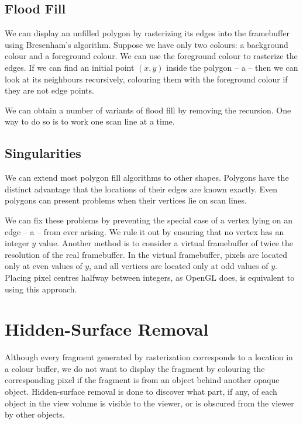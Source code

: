 \documentclass[../COS3712_Notes.tex]{subfiles}
\begin{document}
      \subsection{Flood Fill}
        We can display an unfilled polygon by rasterizing its edges into the framebuffer
        using Bresenham's algorithm.
        Suppose we have only two colours: a background colour and a foreground colour.
        We can use the foreground colour to rasterize the edges.
        If we can find an initial point $(x, y)$ inside the polygon -- a  --
        then we can look at its neighbours recursively, colouring them with the
        foreground colour if they are not edge points.

        We can obtain a number of variants of flood fill by removing the recursion.
        One way to do so is to work one scan line at a time.

      \subsection{Singularities}
        We can extend most polygon fill algorithms to other shapes.
        Polygons have the distinct advantage that the locations of their edges are known exactly.
        Even polygons can present problems when their vertices lie on scan lines.

        We can fix these problems by preventing the special case of a vertex lying on an edge
        -- a  -- from ever arising.
        We rule it out by ensuring that no vertex has an integer $y$ value.
        Another method is to consider a virtual framebuffer of twice the resolution of the
        real framebuffer.
        In the virtual framebuffer, pixels are located only at even values of $y$,
        and all vertices are located only at odd values of $y$.
        Placing pixel centres halfway between integers, as OpenGL does,
        is equivalent to using this approach.

    \section{Hidden-Surface Removal}
      Although every fragment generated by rasterization corresponds to a location in a
      colour buffer, we do not want to display the fragment by colouring the corresponding pixel
      if the fragment is from an object behind another opaque object.
      Hidden-surface removal is done to discover what part, if any, of each object in the
      view volume is visible to the viewer, or is obscured from the viewer by other objects.
\end{document}
